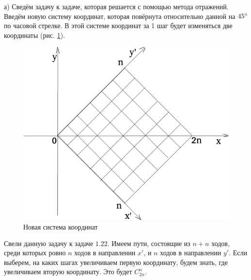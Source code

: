 \documentclass{book}
\begin{document}
а) Сведём задачу к задаче, которая решается с помощью метода отражений.
Введём новую систему координат, которая повёрнута относительно данной на $45 \degree $ по часовой стрелке.
В этой системе координат за 1 шаг будет изменяться две координаты (рис. \ref{fig:422}).

\begin{figure}[h!]
  \centering
  \includegraphics[width=.7\textwidth]{./pictures/4_22.png}
  \caption{Новая система координат}
  \label{fig:422}
\end{figure}

Свели данную задачу к задаче $1.22$.
Имеем пути, состоящие из $n + n$ ходов, среди которых ровно $n$ ходов в направлении $x'$, и $n$ ходов в направлении $y'$.
Если выберем, на каких шагах увеличиваем первую координату, будем знать, где увеличиваем вторую координату.
Это будет $C_{2n}^n$.
\end{document}
